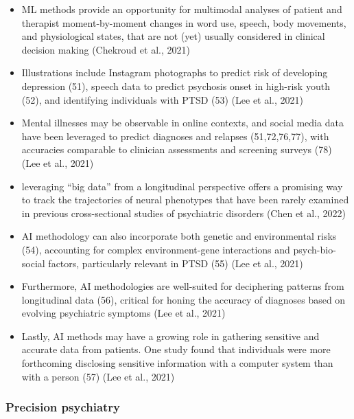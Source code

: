 \documentclass[
  man]{apa7}
\providecommand{\tightlist}{%
  \setlength{\itemsep}{0pt}\setlength{\parskip}{0pt}}
\begin{document}
\begin{itemize}
\tightlist
\item
  ML methods provide an opportunity for multimodal analyses of patient and therapist moment-by-moment changes in word use, speech, body movements, and physiological states, that are not (yet) usually considered in clinical decision making (Chekroud et al., 2021)
\item
  Illustrations include Instagram photographs to predict risk of developing depression (51), speech data to predict psychosis onset in high-risk youth (52), and identifying individuals with PTSD (53) (Lee et al., 2021)
\item
  Mental illnesses may be observable in online contexts, and social media data have been leveraged to predict diagnoses and relapses (51,72,76,77), with accuracies comparable to clinician assessments and screening surveys (78) (Lee et al., 2021)
\item
  leveraging ``big data'' from a longitudinal perspective offers a promising way to track the trajectories of neural phenotypes that have been rarely examined in previous cross-sectional studies of psychiatric disorders (Chen et al., 2022)
\item
  AI methodology can also incorporate both genetic and environmental risks (54), accounting for complex environment-gene interactions and psych-bio-social factors, particularly relevant in PTSD (55) (Lee et al., 2021)
\item
  Furthermore, AI methodologies are well-suited for deciphering patterns from longitudinal data (56), critical for honing the accuracy of diagnoses based on evolving psychiatric symptoms (Lee et al., 2021)
\item
  Lastly, AI methods may have a growing role in gathering sensitive and accurate data from patients. One study found that individuals were more forthcoming disclosing sensitive information with a computer system than with a person (57) (Lee et al., 2021)
\end{itemize}

\hypertarget{precision-psychiatry}{%
\subsubsection{Precision psychiatry}\label{precision-psychiatry}}
\end{document}
